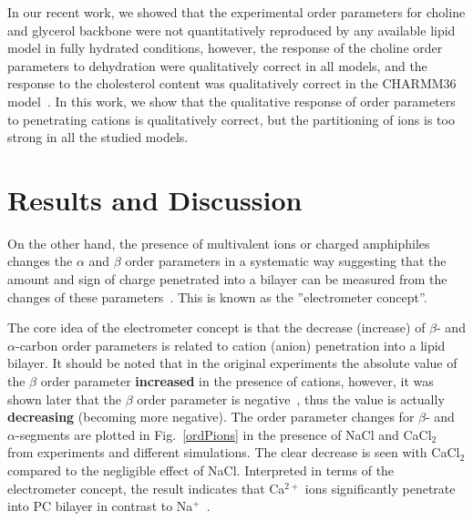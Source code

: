 \documentclass[pre,aps,floatfix,authordate1-4,twocolumn]{revtex4-1}
\begin{document}

In our recent work, we showed that the experimental order parameters for choline and glycerol backbone were not
quantitatively reproduced by any available lipid model in fully hydrated conditions, however, the response of the choline order parameters
to dehydration were qualitatively correct in all  models, and the response to the cholesterol  content
was qualitatively correct in the CHARMM36 model~\cite{botan15}.  In this work, we show that the qualitative response of order parameters
to penetrating cations is qualitatively correct, but the partitioning of ions is too strong in all the studied models.


\section{Results and Discussion}

On the other hand, the presence of multivalent ions or 
charged amphiphiles changes the $\alpha$ and $\beta$ order parameters in a systematic way suggesting that the amount
and sign of charge penetrated into a bilayer can be measured from the changes of these parameters~\cite{akutsu81,altenbach84,seelig87,scherer89}.
This is known as the ''electrometer concept''. 

The core idea of the electrometer concept is that the decrease (increase) of $\beta$- and $\alpha$-carbon order parameters
is related to cation (anion) penetration into a lipid bilayer. 
It should be noted that in the original experiments the absolute value of the $\beta$ order parameter {\bf increased} in the presence of cations,
however, it was shown later that the $\beta$ order parameter is negative~\cite{hong95a,hong95b,gross97}, 
thus the value is actually {\bf decreasing} (becoming more negative).
The order parameter changes for  $\beta$- and $\alpha$-segments 
are plotted in Fig.~\ref{ordPions} in the presence of NaCl and CaCl$_2$ from experiments and different simulations. 
The clear decrease is seen with CaCl$_2$ compared to the negligible effect of NaCl. Interpreted in terms of
the electrometer concept, the result indicates that Ca$^{2+}$ ions significantly penetrate into PC bilayer in contrast to 
Na$^+$~\cite{akutsu81,altenbach84}.
\end{document}
